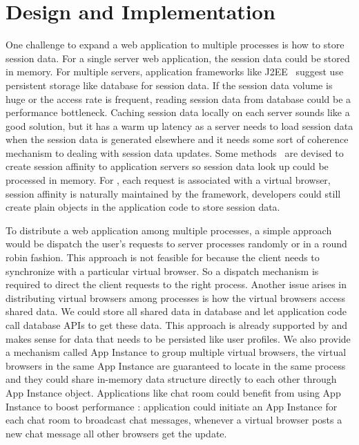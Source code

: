 \section{Design and Implementation}
\label{sec:implementation}
One challenge to expand a web application to multiple processes is 
how to store session data.
For a single server web application, 
the session data could be stored in memory.
For multiple servers,
application frameworks like J2EE~\cite{j2eedoc} suggest use persistent
storage like database for session data.
If the session data volume is huge or the access rate is frequent,
reading session data from database could be a performance bottleneck.
Caching session data locally on each server sounds like a good solution,
but it has a warm up latency as a server needs to load session data when 
the session data is generated elsewhere
and it needs some sort of coherence mechanism to dealing with session data updates.
Some methods~\cite{shachor2005maintaining} are devised to create session affinity
to application servers so session data look up could be processed in memory.
For \cb{}, 
each request is associated with a virtual browser,
session affinity is naturally maintained by the framework,
developers could still create plain \js{} objects in the application code to 
store session data.


To distribute a web application among multiple processes, 
a simple approach would be dispatch the user's requests to server processes randomly or in a round robin fashion.
This approach is not feasible for \cb{} because 
the client needs to synchronize with a particular virtual browser.
So a dispatch mechanism is required to direct the client requests to the right process.
Another issue arises in distributing virtual browsers among processes is 
how the virtual browsers access shared data.
We could store all shared data in database and let application code call database APIs to get these data.
This approach is already supported by \cb{} and makes sense for data that needs to be persisted like user profiles. 
We also provide a mechanism called App Instance to group multiple virtual browsers,
the virtual browsers in the same App Instance are guaranteed to locate in the same process and they could
share in-memory data structure directly to each other through App Instance object.
Applications like chat room could benefit from using App Instance to boost performance :
application could initiate an App Instance for each chat room to broadcast chat messages, 
whenever a virtual browser posts a new chat message all other browsers get the update.




